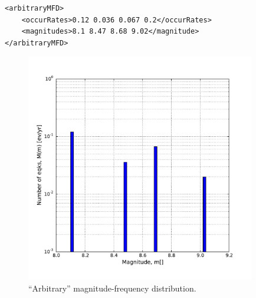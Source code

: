 \begin{description}
\begin{verbatim}
<arbitraryMFD>
    <occurRates>0.12 0.036 0.067 0.2</occurRates>
    <magnitudes>8.1 8.47 8.68 9.02</magnitude>
</arbitraryMFD>
\end{verbatim}

\begin{figure}[!ht]
\centering
\includegraphics[width=10cm]{figures/hazard/arb_mfd.pdf}
\caption{``Arbitrary'' magnitude-frequency distribution.}
\label{fig:arb_mfd}
\end{figure}
  

\end{description}
